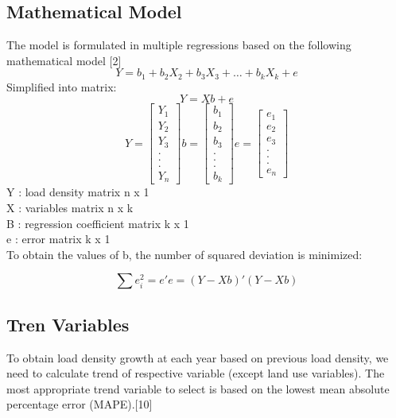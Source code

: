 \documentclass[conference]{IEEEtran}
\begin{document}
{\subsection{Mathematical Model}
The model is formulated in multiple regressions based on the following mathematical model [2]
\begin{equation}
    Y=b_{1}+b_{2}X_{2}+b_{3}X_{3}+\dots+b_{k}X_{k}+e
\end{equation}
Simplified into matrix: 
\begin{equation}\label{eq:8}
    Y=Xb+e 
\end{equation}
\begin{equation*}
Y=
\begin{bmatrix}
  Y_{1}\\Y_{2}\\Y_{3}\\.\\.\\.\\Y_{n}  
\end{bmatrix}
b=
\begin{bmatrix}
    b_{1}\\b_{2}\\b_{3}\\.\\.\\.\\b_{k} 
\end{bmatrix}
e=
\begin{bmatrix}
    e_{1}\\e_{2}\\e_{3}\\.\\.\\.\\e_{n} 
\end{bmatrix}
\end{equation*}
Y : load density matrix n x 1\\
X : variables matrix n x k\\
B : regression coefficient matrix k x 1\\
e  : error matrix k x 1\\
To obtain the values of b, the number of squared deviation is minimized:

\begin{equation}\label{eq:9}
\sum{e_{i}^2} =e'e=(Y-Xb)'(Y-Xb)
\end{equation} 

\subsection{Tren Variables}
To obtain load density growth at each year based on previous load density, we need to calculate trend of respective variable (except land use variables). The most appropriate trend variable to select is based on the lowest mean absolute percentage error (MAPE).[10]

}
\end{document}
